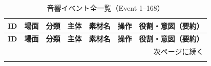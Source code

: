 \begin{longtable}{@{}r p{1.0cm} p{1.0cm} p{2.0cm} p{2.8cm} p{3.0cm} p{6.1cm}@{}}
	\caption{音響イベント全一覧（Event 1–168）}\label{tab:all-events}                                                  \\
	\toprule
	\textbf{ID} & \textbf{場面} & \textbf{分類} & \textbf{主体} & \textbf{素材名} & \textbf{操作} & \textbf{役割・意図（要約）} \\
	\midrule
	\endfirsthead

	\toprule
	\textbf{ID} & \textbf{場面} & \textbf{分類} & \textbf{主体} & \textbf{素材名} & \textbf{操作} & \textbf{役割・意図（要約）} \\
	\midrule
	\endhead

	\midrule
	\multicolumn{7}{r}{\footnotesize 次ページに続く}                                                               \\
	\endfoot

	\bottomrule
	\endlastfoot


\end{longtable}
